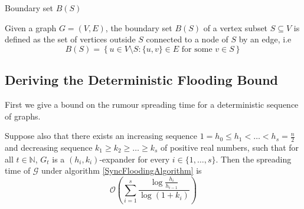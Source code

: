 \begin{definition}
	Boundary set $B(S)$

	\noindent 
	Given a graph $G=(V,E)$, the boundary set $B(S)$ of a vertex subset $S \subseteq V$ is defined as the set of vertices outside $S$ connected to a node of $S$ by an edge, i.e
	$$
		B(S) = \left\{u \in V \setminus S : \{u, v\} \in E \text{ for some } v \in S \right\}
	$$
\end{definition}

\subsection{Deriving the Deterministic Flooding Bound}

First we give a bound on the rumour spreading time for a deterministic sequence of graphs. 

\begin{theorem}\label{theorem:DeterministicFloodingBound}
	\ModelIntro Suppose also that there exists an increasing sequence $1 = h_0 \leq h_1 < \dots < h_s = \frac{n}{2}$ and decreasing sequence $k_1 \geq k_2 \geq \dots \geq k_s$ of positive real numbers, such that for all $t \in \mathbb{N}$, $G_t$ is a $(h_i, k_i)$-expander for every $i \in \{1, \dots , s\}$. Then the spreading time of $\mathcal{G}$ under algorithm \ref{SyncFloodingAlgorithm} is
	$$
		\mathcal{O}\left(\sum_{i=1}^s \frac{\log \frac{h_i}{h_{i-1}}}{\log(1+k_i)}\right)
	$$
\end{theorem}


